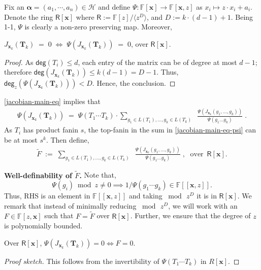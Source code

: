 \documentclass[10pt,a4paper]{article}
\newcommand{\F}{\mathbb{F}}
\newcommand{\ringR}{\mathsf{R}}
\newcommand{\x}{{\boldsymbol x}}
\newcommand{\alphavec}{\boldsymbol \alpha}
\newcommand{\T}{{\boldsymbol T}}
\newcommand{\calH}{\mathcal{H}}
\newcommand{\pdeg}{\mathsf{deg}}
\numberwithin{equation}{section}
\begin{document}
Fix an $\alphavec = (a_1, \cdots, a_n) \in \calH$ and define $\Psi: \F[\x] \to \F[\x,z]$ as $x_i \mapsto z \cdot x_i + a_i$.
%
Denote the ring $\ringR[\x]$ where $\ringR:=\F[z]/\langle z^D \rangle$, and $D:=k\cdot(d-1)+1$. Being 1-1, $\Psi$ is clearly a non-zero preserving map. Moreover,
\begin{claim}\label{cl:psi-iff}
$J_{{\x}_k}(\T_k)\;=\; 0\; \iff\; \Psi(J_{{\x}_k}(\T_k))\;=\;0 $, over $\ringR[\x]$. 
\end{claim}

\begin{proof}
As $\pdeg(T_i) \le d$, each entry of the matrix can be of degree at most $d-1$; therefore $\pdeg(J_{{\x}_k}(\T_k)) \le  k(d-1)= D-1$. Thus, $\pdeg_{z}(\Psi(J_{{\x}_k}(\T_k))) <D$. Hence, the conclusion.
\end{proof}
\autoref{jacobian-main-eq} implies that 
\begin{align}
    \Psi(J_{{\x}_k}(\T_k))\;=\;\Psi(T_1 \cdots T_k) \cdot \sum_{g_1 \in L(T_1) , \hdots , g_k \in L(T_k)}\;\; \frac{ \Psi(J_{{\x}_k}(g_1,\hdots,g_k))}{\Psi(g_1 \hdots g_k)} \;. \label{jacobian-main-eq-psi}
\end{align}
As $T_i$ has product fanin $s$, the top-fanin in the sum in \autoref{jacobian-main-eq-psi} can be at most $s^k$. Then define, 
\begin{align}
\widetilde{F}\;:=\;\sum_{g_1 \in L(T_1) ,\hdots , g_k \in L(T_k)}\;\; \frac{\Psi(J_{{\x}_k}(g_1,\hdots,g_k))}{\Psi(g_1 \hdots g_k)} \;,\;\text{ over }\,\ringR[\x]. \label{eq:main-eq-F-psi}
\end{align}

\textbf{Well-definability of $\widetilde{F}$.} Note that, \[\Psi(g_i) \bmod z \ne 0 \implies 1/\Psi(g_1 \cdots g_k) \in \F[[\x,z]].\] Thus, RHS is an element in $\F[[\x,z]]$ and taking $\bmod\, z^D$ it is in $\ringR[\x]$. We remark that instead of minimally reducing $\bmod\,z^D$, we will work with an $F \in \F[z,\x]$ such that    $F=\tilde{F}$ over $\ringR[\x]$. Further, we ensure that the degree of $z$ is polynomially bounded.

\begin{claim}\label{cl:psi-to-F}
Over $\ringR[\x]$, $\Psi(J_{{\x}_k}(\T_k)) = 0  \iff F =0$.  
\end{claim}

\begin{proof}[Proof sketch]
This follows from the invertibility of $\Psi(T_1 \cdots T_k)$ in $R[\x]$.
%
\end{proof}
\end{document}
